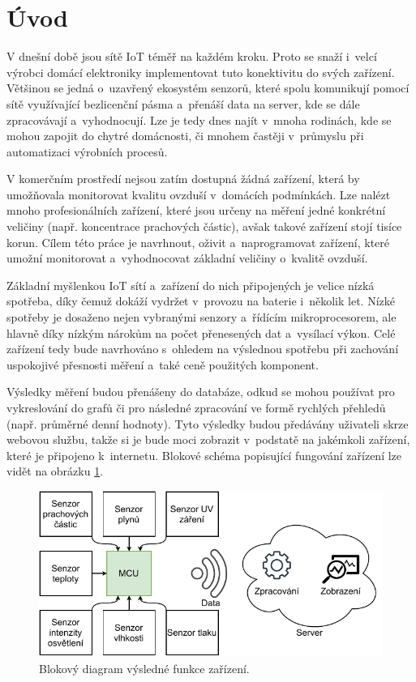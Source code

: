 \chapter*{Úvod}
{}

V dnešní době jsou sítě IoT téměř na každém kroku. Proto se snaží i~velcí výrobci domácí elektroniky implementovat tuto konektivitu do svých zařízení. Většinou se jedná o~uzavřený ekosystém senzorů, které spolu komunikují pomocí sítě využívající bezlicenční pásma a~přenáší data na server, kde se dále zpracovávají a~vyhodnocují. Lze je tedy dnes najít v~mnoha rodinách, kde se mohou zapojit do chytré domácnosti, či mnohem častěji v~průmyslu při automatizaci výrobních procesů.

V komerčním prostředí nejsou zatím dostupná žádná zařízení, která by umožňovala monitorovat kvalitu ovzduší v~domácích podmínkách. Lze nalézt mnoho profesionálních zařízení, které jsou určeny na měření jedné konkrétní veličiny (např. koncentrace prachových částic), avšak takové zařízení stojí tisíce korun. Cílem této práce je navrhnout, oživit a~naprogramovat zařízení, které umožní monitorovat a~vyhodnocovat základní veličiny o~kvalitě ovzduší.

Základní myšlenkou IoT sítí a~zařízení do nich připojených je velice nízká spotřeba, díky čemuž dokáží vydržet v~provozu na baterie i~několik let. Nízké spotřeby je dosaženo nejen vybranými senzory a~řídícím mikroprocesorem, ale hlavně díky nízkým nárokům na počet přenesených dat a~vysílací výkon. Celé zařízení tedy bude navrhováno s~ohledem na výslednou spotřebu při zachování uspokojivé přesnosti měření a~také ceně použitých komponent.

Výsledky měření budou přenášeny do databáze, odkud se mohou používat pro vykreslování do grafů či pro následné zpracování ve formě rychlých přehledů (např. průměrné denní hodnoty). Tyto výsledky budou předávány uživateli skrze webovou službu, takže si je bude moci zobrazit v~podstatě na jakémkoli zařízení, které je připojeno k~internetu. Blokové schéma popisující fungování zařízení lze vidět na obrázku \ref{fig_BlockDiagram-blank}.

\begin{figure}[h]
    \centering
    \includegraphics{obrazky/block_schematic-blank.drawio.pdf}
    \caption{Blokový diagram výsledné funkce zařízení.}
    \label{fig_BlockDiagram-blank}
\end{figure}